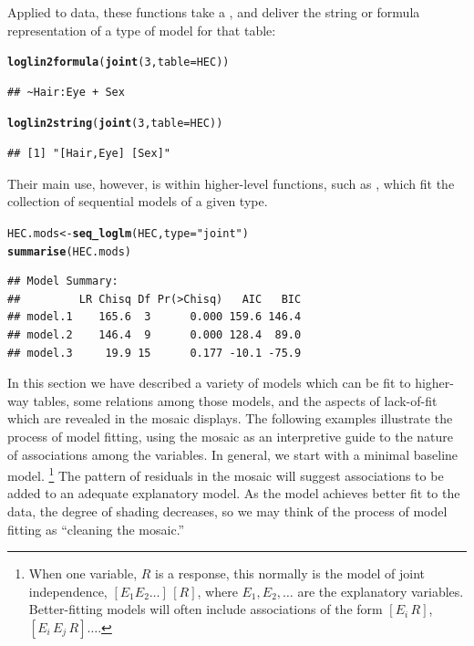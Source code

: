 \documentclass[11pt]{book}\usepackage[]{graphicx}\usepackage[]{color}
\makeatletter
\newcommand{\hlnum}[1]{\textcolor[rgb]{0.686,0.059,0.569}{#1}}%
\newcommand{\hlstr}[1]{\textcolor[rgb]{0.192,0.494,0.8}{#1}}%
\newcommand{\hlstd}[1]{\textcolor[rgb]{0.345,0.345,0.345}{#1}}%
\newcommand{\hlkwb}[1]{\textcolor[rgb]{0.69,0.353,0.396}{#1}}%
\newcommand{\hlkwc}[1]{\textcolor[rgb]{0.333,0.667,0.333}{#1}}%
\newcommand{\hlkwd}[1]{\textcolor[rgb]{0.737,0.353,0.396}{\textbf{#1}}}%
\newenvironment{kframe}{%
 \def\at@end@of@kframe{}%
 \ifinner\ifhmode%
  \def\at@end@of@kframe{\end{minipage}}%
  \begin{minipage}{\columnwidth}%
 \fi\fi%
 \def\FrameCommand##1{\hskip\@totalleftmargin \hskip-\fboxsep
 \colorbox{shadecolor}{##1}\hskip-\fboxsep
     \hskip-\linewidth \hskip-\@totalleftmargin \hskip\columnwidth}%
 \MakeFramed {\advance\hsize-\width
   \@totalleftmargin\z@ \linewidth\hsize
   \@setminipage}}%
 {\par\unskip\endMakeFramed%
 \at@end@of@kframe}
\newenvironment{knitrout}{}{} %
\renewenvironment{knitrout}{\small\renewcommand{\baselinestretch}{.85}}{} %
\makeatother
\begin{document}
Applied to data, these functions take a , and deliver
the string or formula representation of a type of model for that table:
\begin{knitrout}
\color{fgcolor}\begin{kframe}
\begin{alltt}
\hlkwd{loglin2formula}\hlstd{(}\hlkwd{joint}\hlstd{(}\hlnum{3}\hlstd{,} \hlkwc{table}\hlstd{=HEC))}
\end{alltt}
\begin{verbatim}
## ~Hair:Eye + Sex
\end{verbatim}
\begin{alltt}
\hlkwd{loglin2string}\hlstd{(}\hlkwd{joint}\hlstd{(}\hlnum{3}\hlstd{,} \hlkwc{table}\hlstd{=HEC))}
\end{alltt}
\begin{verbatim}
## [1] "[Hair,Eye] [Sex]"
\end{verbatim}
\end{kframe}
\end{knitrout}

Their main use, however, is within higher-level functions,
such as , which fit the collection of sequential models
of a given type.
\begin{knitrout}
\color{fgcolor}\begin{kframe}
\begin{alltt}
\hlstd{HEC.mods} \hlkwb{<-} \hlkwd{seq_loglm}\hlstd{(HEC,} \hlkwc{type}\hlstd{=}\hlstr{"joint"}\hlstd{)}
\hlkwd{summarise}\hlstd{(HEC.mods)}
\end{alltt}
\begin{verbatim}
## Model Summary:
##         LR Chisq Df Pr(>Chisq)   AIC   BIC
## model.1    165.6  3      0.000 159.6 146.4
## model.2    146.4  9      0.000 128.4  89.0
## model.3     19.9 15      0.177 -10.1 -75.9
\end{verbatim}
\end{kframe}
\end{knitrout}


In this section we have described a variety of models which can be fit
to higher-way tables, some relations among those models, and the aspects
of lack-of-fit which are revealed in the mosaic displays.
The following examples illustrate the process of model fitting,
using the mosaic as an interpretive guide to the nature of associations
among the variables.
In general, we start with a minimal baseline model.%
%
\footnote{When one variable, $R$
is a response, this normally is the model of joint independence,
\([E_1 E_2 \dots] \, [R]\), where \(E_1, E_2, \dots\) are the explanatory
variables.  Better-fitting models will often include associations
of the form \([E_i \, R]\), \([E_i \, E_j \, R] \dots \).
}
The pattern of residuals in the mosaic will suggest associations to be added
to an adequate explanatory model.
As the model achieves better fit to the data, the degree of shading
decreases, so we may think of the process of model fitting as
``cleaning the mosaic.''
\end{document}
